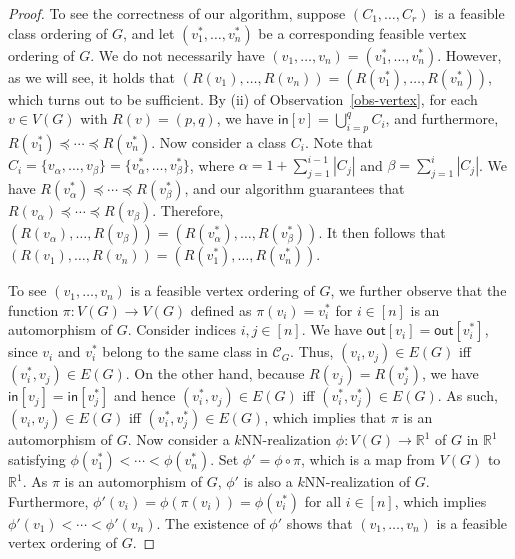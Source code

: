 \begin{proof}
To see the correctness of our algorithm, suppose $(C_1,\dots,C_r)$ is a feasible class ordering of $G$, and let $(v_1^*,\dots,v_n^*)$ be a corresponding feasible vertex ordering of $G$.
We do not necessarily have $(v_1,\dots,v_n) = (v_1^*,\dots,v_n^*)$.
However, as we will see, it holds that $(R(v_1),\dots,R(v_n)) = (R(v_1^*),\dots,R(v_n^*))$, which turns out to be sufficient.
By (ii) of Observation~\ref{obs-vertex}, for each $v \in V(G)$ with $R(v) = (p,q)$, we have $\mathsf{in}[v] = \bigcup_{i=p}^q C_i$, and furthermore, $R(v_1^*) \preceq \cdots \preceq R(v_n^*)$.
Now consider a class $C_i$.
Note that $C_i = \{v_\alpha,\dots,v_\beta\} = \{v_\alpha^*,\dots,v_\beta^*\}$, where $\alpha = 1+\sum_{j=1}^{i-1} |C_j|$ and $\beta = \sum_{j=1}^i |C_j|$.
We have $R(v_\alpha^*) \preceq \cdots \preceq R(v_\beta^*)$, and our algorithm guarantees that $R(v_\alpha) \preceq \cdots \preceq R(v_\beta)$.
Therefore, $(R(v_\alpha),\dots,R(v_\beta)) = (R(v_\alpha^*),\dots,R(v_\beta^*))$.
It then follows that $(R(v_1),\dots,R(v_n)) = (R(v_1^*),\dots,R(v_n^*))$.

To see $(v_1,\dots,v_n)$ is a feasible vertex ordering of $G$, we further observe that the function $\pi:V(G) \rightarrow V(G)$ defined as $\pi(v_i) = v_i^*$ for $i \in [n]$ is an automorphism of $G$.
Consider indices $i,j \in [n]$.
We have $\mathsf{out}[v_i] = \mathsf{out}[v_i^*]$, since $v_i$ and $v_i^*$ belong to the same class in $\mathcal{C}_G$.
Thus, $(v_i,v_j) \in E(G)$ iff $(v_i^*,v_j) \in E(G)$.
On the other hand, because $R(v_j) = R(v_j^*)$, we have $\mathsf{in}[v_j] = \mathsf{in}[v_j^*]$ and hence $(v_i^*,v_j) \in E(G)$ iff $(v_i^*,v_j^*) \in E(G)$.
As such, $(v_i,v_j) \in E(G)$ iff $(v_i^*,v_j^*) \in E(G)$, which implies that $\pi$ is an automorphism of $G$.
Now consider a $k$NN-realization $\phi:V(G) \rightarrow \mathbb{R}^1$ of $G$ in $\mathbb{R}^1$ satisfying $\phi(v_1^*) < \cdots < \phi(v_n^*)$.
Set $\phi' = \phi \circ \pi$, which is a map from $V(G)$ to $\mathbb{R}^1$.
As $\pi$ is an automorphism of $G$, $\phi'$ is also a $k$NN-realization of $G$.
Furthermore, $\phi'(v_i) = \phi(\pi(v_i)) = \phi(v_i^*)$ for all $i \in [n]$, which implies $\phi'(v_1) < \cdots < \phi'(v_n)$.
The existence of $\phi'$ shows that $(v_1,\dots,v_n)$ is a feasible vertex ordering of $G$.
\end{proof}

